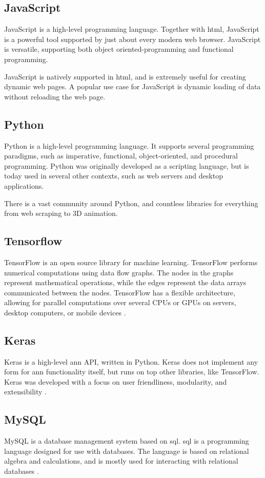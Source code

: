 \subsection{JavaScript}

JavaScript is a high-level programming language. Together with \gls{html}, JavaScript is a powerful tool supported by just about every modern web browser. JavaScript is versatile, supporting both object oriented-programming and functional programming.

JavaScript is natively supported in \gls{html}, and is extremely useful for creating dynamic web pages. A popular use case for JavaScript is dynamic loading of data without reloading the web page.


\subsection{Python}

Python is a high-level programming language. It supports several programming paradigms, such as imperative, functional, object-oriented, and procedural programming. Python was originally developed as a scripting language, but is today used in several other contexts, such as web servers and desktop applications.

There is a vast community around Python, and countless libraries for everything from web scraping to 3D animation.


\subsection{Tensorflow}

TensorFlow is an open source library for machine learning. TensorFlow performs numerical computations using data flow graphs. The nodes in the graphs represent mathematical operations, while the edges represent the data arrays communicated between the nodes. TensorFlow has a flexible architecture, allowing for parallel computations over several CPUs or GPUs on servers, desktop computers, or mobile devices \citep{bib:tensorflow}.


\subsection{Keras}

Keras is a high-level \gls{ann} API, written in Python. Keras does not implement any form for \gls{ann} functionality itself, but runs on top other libraries, like TensorFlow. Keras was developed with a focus on user friendliness, modularity, and extensibility \citep{bib:keras}.


\subsection{MySQL}

MySQL is a database management system based on \gls{sql}. \gls{sql} is a programming language designed for use with databases. The language is based on relational algebra and calculations, and is mostly used for interacting with relational databases \citep{bib:codd1982relational}.